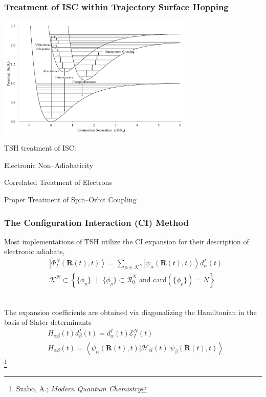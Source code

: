 \documentclass[usepdftitle=false,10pt]{beamer}
\newcommand{\cmark}{\color{green} \ding{51}}%
\newcommand{\done}{\rlap{$\square$}{\raisebox{2pt}{\large\hspace{1pt}\cmark}}%
\hspace{-2.5pt}}
\newcommand{\ket}[1]{\left\vert #1 \right\rangle}         %
\newcommand{\innerop}[3]{\left\langle #1 \left\vert #2 \right\vert #3 \right\rangle}  %
\newcommand*\suchthat[0]{\text{ }\vert\text{ }}
\newcommand*\vc[1]{\boldsymbol{#1}}
\newcommand\blfootnote[1]{%
  \begingroup
  \renewcommand\thefootnote{}\footnote{#1}%
  \addtocounter{footnote}{-1}%
  \endgroup
}
\begin{document}
\begin{frame}
  \frametitle{Treatment of ISC within Trajectory Surface Hopping}
  \begin{center}
  \includegraphics[width=0.7\textwidth]{ISC} 
  \end{center}
  \vspace{-0.5cm}
  TSH treatment of ISC: 
  \begin{mylist}
    \item[\done] Electronic Non--Adiabaticity
    \item Correlated Treatment of Electrons
    \item Proper Treatment of Spin--Orbit Coupling
  \end{mylist}
\end{frame}

\begin{frame}
  \frametitle{The Configuration Interaction (CI) Method}

  Most implementations of TSH utilize the CI expansion for their description
  of electronic adiabats,
  \begin{align*}
  &\ket{\Phi^N_I (\vc{R}(t),t)} = \sum_{\alpha \in \mathcal{K}^N}  
    \ket{\psi_\alpha (\vc{R}(t),t)} d^I_\alpha(t)
  \\
  & \mathcal{K}^N \subset \left\lbrace \{ \phi_p \} \suchthat \{ \phi_p \} \subset
  \mathcal{R}_0^N \text{ and } \mathrm{card}(\{ \phi_p \}) = N \right\rbrace
  \end{align*}
  
  ~\\
  The expansion coefficients are obtained via diagonalizing the Hamiltonian
  in the basis of Slater determinants
  \begin{align*}
  &H_{\alpha\beta}(t) d_\beta^I(t) = d_\alpha^I(t) \mathcal{E}^N_I(t)
  \\
  &H_{\alpha\beta}(t) =
  \innerop{\psi_\alpha(\vc{R}(t),t)}{\mathcal{H}_{el}(t)}{\psi_\beta(\vc{R}(t),t)}
  \end{align*}
  \blfootnote{\tiny Szabo, A.; \emph{Modern Quantum Chemistry}}
\end{frame}
\end{document}
